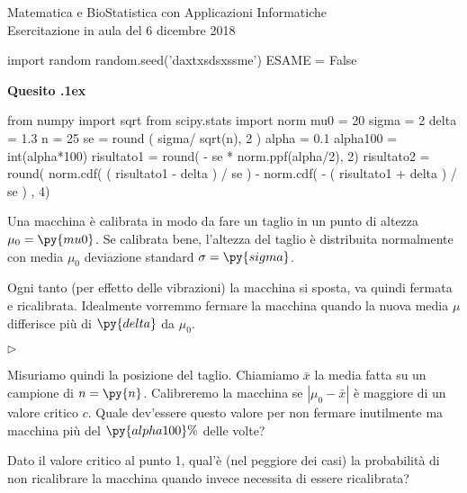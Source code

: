 \documentclass[11pt,twoside,a4paper]{article}
\newcommand{\mylabel}[1]{#1\hfill}
\renewenvironment{itemize}
  {\begin{list}{$\triangleright$}{%
   \setlength{\parskip}{0mm}
   \setlength{\topsep}{.4\baselineskip}
   \setlength{\rightmargin}{0mm}
   \setlength{\listparindent}{0mm}
   \setlength{\itemindent}{0mm}
   \setlength{\labelwidth}{2ex}
   \setlength{\itemsep}{.4\baselineskip}
   \setlength{\parsep}{0mm}
   \setlength{\partopsep}{0mm}
   \setlength{\labelsep}{1ex}
   \setlength{\leftmargin}{\labelwidth+\labelsep}
   \let\makelabel\mylabel}}{%
   \end{list}\vspace*{-1.3mm}}
\newcounter{quesito}
\newenvironment{question}{\addtocounter{quesito}{1}\par\textbf{Quesito \thequesito.\kern1ex}}{\vspace{0.5\parskip}}
\begin{document}
\colorbox{blue!10}{\begin{minipage}{\textwidth}
Matematica e BioStatistica con Applicazioni Informatiche\\
Esercitazione in aula del 6 dicembre 2018
\end{minipage}}



\begin{pycode}
import random
random.seed('daxtxsdsxssme')
ESAME = False
\end{pycode}


\bigskip\bigskip
\begin{question}
\begin{pycode}
from numpy import sqrt
from scipy.stats import norm
mu0 = 20
sigma = 2
delta = 1.3
n = 25
se = round ( sigma/ sqrt(n), 2 )
alpha = 0.1
alpha100 = int(alpha*100)
risultato1 = round( - se * norm.ppf(alpha/2), 2)
risultato2 = round( norm.cdf( ( risultato1 - delta ) / se )
- 
norm.cdf( - ( risultato1 + delta ) / se )
, 4)
\end{pycode}

Una macchina è calibrata in modo da fare un taglio in un punto di altezza $\mu_0=\py{mu0}$. Se calibrata bene, l'altezza del taglio è distribuita normalmente con media $\mu_0$ deviazione standard $\sigma=\py{sigma}$. 

Ogni tanto (per effetto delle vibrazioni) la macchina si sposta, va quindi fermata e ricalibrata. Idealmente vorremmo fermare la macchina quando la nuova media $\mu$ differisce più di $\py{delta}$ da $\mu_0$.

\begin{itemize}
\item[1.] Misuriamo quindi la posizione del taglio. Chiamiamo $\bar x$ la media fatta su un campione di $n=\py{n}$. Calibreremo la macchina se $|\mu_0-\bar x|$ è maggiore di un valore critico $c$. Quale dev'essere questo valore per non fermare inutilmente ma macchina più del $\py{alpha100}\%$ delle volte?

\item[2.] Dato il valore critico al punto 1, qual'è (nel peggiore dei casi) la probabilità di non ricalibrare la macchina quando invece necessita di essere ricalibrata?



\end{itemize}
\end{question}
\end{document}
